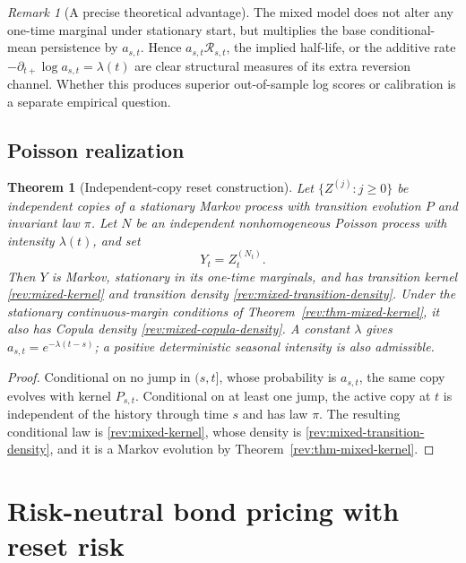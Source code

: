 \documentclass[11pt]{article}
\newtheorem{theorem}[definition]{Theorem}
\theoremstyle{remark}
\newtheorem{remark}[definition]{Remark}
\begin{document}
\begin{remark}[A precise theoretical advantage]
The mixed model does not alter any one-time marginal under stationary start,
but multiplies the base conditional-mean persistence by $a_{s,t}$.  Hence
$a_{s,t}\mathcal R_{s,t}$, the implied half-life, or the additive rate
$-\partial_{t+}\log a_{s,t}=\lambda(t)$ are clear structural measures of its
extra reversion channel.  Whether this produces superior out-of-sample log
scores or calibration is a separate empirical question.
\end{remark}

\subsection{Poisson realization}

\begin{theorem}[Independent-copy reset construction]
\label{rev:thm-poisson-construction}
Let $\{Z^{(j)}:j\ge0\}$ be independent copies of a stationary Markov process
with transition evolution $P$ and invariant law $\pi$.  Let $N$ be an
independent nonhomogeneous Poisson process with intensity $\lambda(t)$, and set
\begin{equation}
Y_t=Z_t^{(N_t)}.
\label{rev:poisson-copy-process}
\end{equation}
Then $Y$ is Markov, stationary in its one-time marginals, and has transition
kernel \eqref{rev:mixed-kernel} and transition density
\eqref{rev:mixed-transition-density}.  Under the stationary continuous-margin
conditions of Theorem~\ref{rev:thm-mixed-kernel}, it also has Copula density
\eqref{rev:mixed-copula-density}.  A constant $\lambda$ gives
$a_{s,t}=e^{-\lambda(t-s)}$; a positive deterministic seasonal intensity is
also admissible.
\end{theorem}

\begin{proof}
Conditional on no jump in $(s,t]$, whose probability is $a_{s,t}$, the same
copy evolves with kernel $P_{s,t}$.  Conditional on at least one jump, the
active copy at $t$ is independent of the history through time $s$ and has law
$\pi$.  The resulting conditional law is \eqref{rev:mixed-kernel}, whose
density is \eqref{rev:mixed-transition-density}, and it is a
Markov evolution by Theorem~\ref{rev:thm-mixed-kernel}.
\end{proof}

\section{Risk-neutral bond pricing with reset risk}
\end{document}
